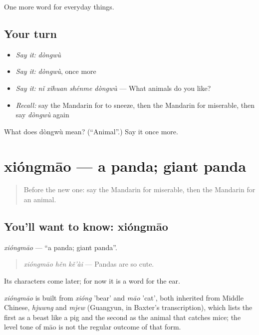 \begin{grammarlens}[title={What you've built}]
One more word for everyday things.
\end{grammarlens}

\subsection*{Your turn}
\begin{itemize}
\raggedright
  \item \emph{Say it:} \emph{dòngwù}
  \item \emph{Say it:} \emph{dòngwù}, once more
  \item \emph{Say it:} \emph{nǐ xǐhuan shénme dòngwù} — What animals do you like?
  \item \emph{Recall:} say the Mandarin for to sneeze, then the Mandarin for miserable, then say \emph{dòngwù} again
\end{itemize}

\begin{tcolorbox}[breakable,colback=teal!4,colframe=teal!35!black,title={Before you move on}]
What does dòngwù mean? (\textquotedblleft{}Animal\textquotedblright{}.) Say it once more.
\end{tcolorbox}
\section[xióngmāo]{xióngmāo — a panda; giant panda}

\label{lesson:ZH-C223-xiongmao}



\begin{quote}
Before the new one: say the Mandarin for miserable, then the Mandarin for an animal.
\end{quote}

\subsection*{You'll want to know: xióngmāo}
\emph{xióngmāo} — \textquotedblleft{}a panda; giant panda\textquotedblright{}.

\begin{quote}
\emph{xióngmāo hěn kě'ài} — Pandas are so cute.
\end{quote}

Its characters come later; for now it is a word for the ear.

\begin{cousinweb}
\emph{xióngmāo} is built from \emph{xióng} 'bear' and \emph{māo} 'cat', both inherited from Middle Chinese, \emph{hjuwng} and \emph{mjew} (Guangyun, in Baxter's transcription), which lists the first as a beast like a pig and the second as the animal that catches mice; the level tone of māo is not the regular outcome of that form.
\end{cousinweb}

